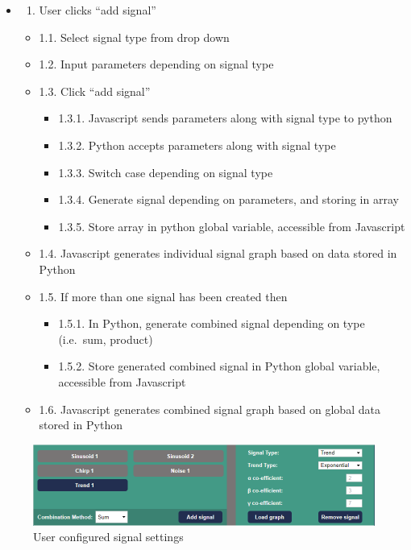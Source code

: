 \documentclass[
  english,
  paper=a4,
  oneside  ,captions=tableheading
]{scrbook}
\providecommand{\tightlist}{%
  \setlength{\itemsep}{0pt}\setlength{\parskip}{0pt}}
\begin{document}
\begin{itemize}
\item
  \begin{enumerate}
  \def\labelenumi{\arabic{enumi}.}
  \tightlist
  \item
    User clicks ``add signal''
  \end{enumerate}

  \begin{itemize}
  \tightlist
  \item
    1.1. Select signal type from drop down
  \item
    1.2. Input parameters depending on signal type
  \item
    1.3. Click ``add signal''

    \begin{itemize}
    \tightlist
    \item
      1.3.1. Javascript sends parameters along with signal type to
      python
    \item
      1.3.2. Python accepts parameters along with signal type
    \item
      1.3.3. Switch case depending on signal type
    \item
      1.3.4. Generate signal depending on parameters, and storing in
      array
    \item
      1.3.5. Store array in python global variable, accessible from
      Javascript
    \end{itemize}
  \item
    1.4. Javascript generates individual signal graph based on data
    stored in Python
  \item
    1.5. If more than one signal has been created then

    \begin{itemize}
    \tightlist
    \item
      1.5.1. In Python, generate combined signal depending on type
      (i.e.~sum, product)
    \item
      1.5.2. Store generated combined signal in Python global variable,
      accessible from Javascript
    \end{itemize}
  \item
    1.6. Javascript generates combined signal graph based on global data
    stored in Python
  \end{itemize}
\end{itemize}

\begin{figure}
\centering
\includegraphics{img/configure_settings.PNG}
\caption{User configured signal settings}
\end{figure}
\end{document}
